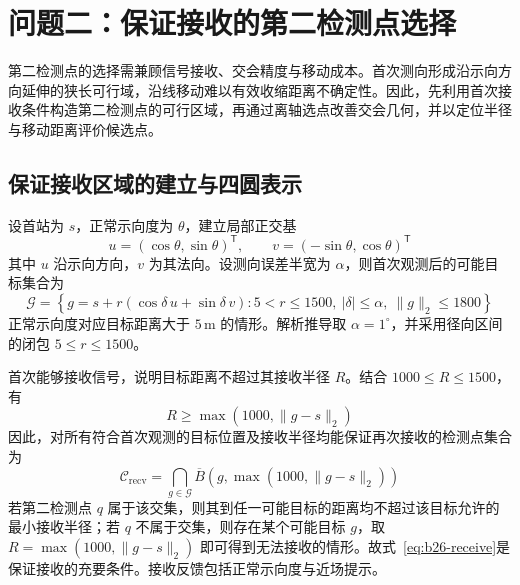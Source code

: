 \documentclass[withoutpreface,bwprint]{cumcmthesis} %
\begin{document}
\section{问题二：保证接收的第二检测点选择}
第二检测点的选择需兼顾信号接收、交会精度与移动成本。首次测向形成沿示向方向延伸的狭长可行域，沿线移动难以有效收缩距离不确定性。因此，先利用首次接收条件构造第二检测点的可行区域，再通过离轴选点改善交会几何，并以定位半径与移动距离评价候选点。
\subsection{保证接收区域的建立与四圆表示}
设首站为 $s$，正常示向度为 $\theta$，建立局部正交基
\[
 u=(\cos\theta,\sin\theta)^{\mathsf T},\qquad
 v=(-\sin\theta,\cos\theta)^{\mathsf T}
\]
其中 $u$ 沿示向方向，$v$ 为其法向。设测向误差半宽为 $\alpha$，则首次观测后的可能目标集合为
\begin{equation}
 \mathcal G=\left\{g=s+r(\cos\delta\,u+\sin\delta\,v):
 5<r\leq1500,\ |\delta|\leq\alpha,\ \|g\|_2\leq1800\right\}
 \label{eq:b26-G}
\end{equation}
正常示向度对应目标距离大于 $5\,\mathrm m$ 的情形。解析推导取 $\alpha=1^\circ$，并采用径向区间的闭包 $5\leq r\leq1500$。

首次能够接收信号，说明目标距离不超过其接收半径 $R$。结合 $1000\leq R\leq1500$，有
\begin{equation}
 R\geq\max(1000,\|g-s\|_2)
 \label{eq:b26-Rlower}
\end{equation}
因此，对所有符合首次观测的目标位置及接收半径均能保证再次接收的检测点集合为
\begin{equation}
 \mathcal C_{\mathrm{recv}}
 =\bigcap_{g\in\mathcal G}\overline B\left(g,\max(1000,\|g-s\|_2)\right)
 \label{eq:b26-receive}
\end{equation}
若第二检测点 $q$ 属于该交集，则其到任一可能目标的距离均不超过该目标允许的最小接收半径；若 $q$ 不属于交集，则存在某个可能目标 $g$，取 $R=\max(1000,\|g-s\|_2)$ 即可得到无法接收的情形。故式~\eqref{eq:b26-receive}是保证接收的充要条件。接收反馈包括正常示向度与近场提示。
\end{document}
